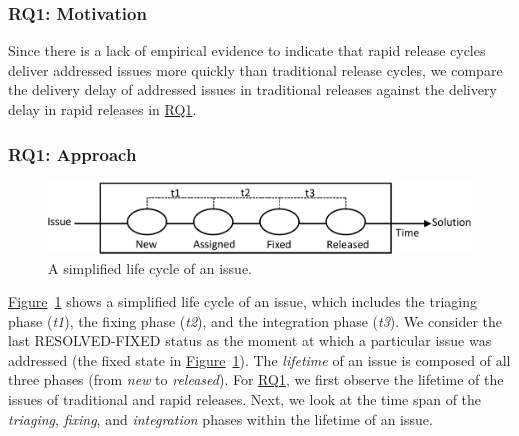 \subsubsection*{RQ1: Motivation} 

Since there is a lack of empirical evidence to indicate that rapid release
cycles deliver addressed issues more quickly than traditional release cycles, we
compare the delivery delay of addressed issues in traditional releases against
the delivery delay in rapid releases in \hyperref[ch5:rq1]{RQ1}.\\

\subsubsection*{RQ1: Approach}

\begin{figure}[t!]
	\centering
	\includegraphics[width=\columnwidth,keepaspectratio]
	{chapters/chapter5/figures/rq1/issue_lifecycle.pdf}
	\caption{A simplified life cycle of an issue.}
	\label{fig:issue_lifecycle}
\end{figure}

\hyperref[fig:issue_lifecycle]{Figure}~\ref{fig:issue_lifecycle} shows a
simplified life cycle of an issue, which includes the triaging phase ({\em t1}),
the fixing phase ({\em t2}), and the integration phase ({\em t3}). We consider
the last RESOLVED-FIXED status as the moment at which a particular issue was
addressed (the fixed state in
\hyperref[fig:issue_lifecycle]{Figure}~\ref{fig:issue_lifecycle}). The
\textit{lifetime} of an issue is composed of all three phases (from \textit{new}
to \textit{released}). For \hyperref[ch5:rq1]{RQ1}, we first observe the lifetime of the issues of
traditional and rapid releases.  Next, we look at the time span of the
\textit{triaging}, \textit{fixing}, and \textit{integration} phases within the
lifetime of an issue.

